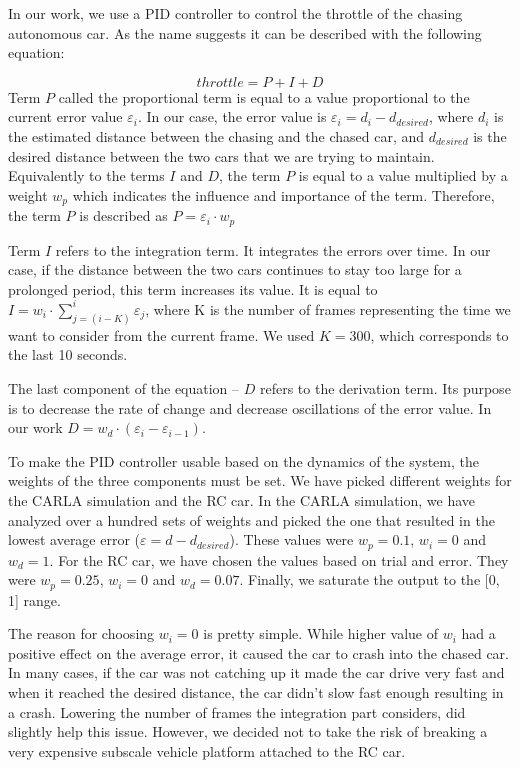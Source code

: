 \documentclass{ctuthesis/ctuthesis}
\begin{document}
In our work, we use a PID controller to control the throttle of the chasing autonomous car. As the name suggests it can be described with the following equation:

\begin{equation}
throttle = P+I+D    
\end{equation}
Term $P$ called the proportional term is equal to a value proportional to the current error value $\varepsilon_i$. In our case, the error value is $\varepsilon_i = d_i - d_{desired}$, where $d_i$ is the estimated distance between the chasing and the chased car, and $d_{desired}$ is the desired distance between the two cars that we are trying to maintain. Equivalently to the terms $I$ and $D$, the term $P$ is equal to a value multiplied by a weight $w_p$ which indicates the influence and importance of the term. Therefore, the term $P$ is described as $P = \varepsilon_i\cdot w_p$ \par


Term $I$ refers to the integration term. It integrates the errors over time. In our case, if the distance between the two cars continues to stay too large for a prolonged period, this term increases its value. It is equal to $I = w_i\cdot \sum_{j=(i-K)}^{i} \varepsilon_j$, where K is the number of frames representing the time we want to consider from the current frame. We used $K = 300$, which corresponds to the last 10 seconds.\par


The last component of the equation -- $D$ refers to the derivation term. Its purpose is to decrease the rate of change and decrease oscillations of the error value. In our work $D = w_d\cdot (\varepsilon_i-\varepsilon_{i-1})$. \par


To make the PID controller usable based on the dynamics of the system, the weights of the three components must be set. We have picked different weights for the CARLA simulation and the RC car. In the CARLA simulation, we have analyzed over a hundred sets of weights and picked the one that resulted in the lowest average error ($\varepsilon = d - d_{desired}$). These values were $w_p=0.1$, $w_i=0$ and $w_d=1$. For the RC car, we have chosen the values based on trial and error. They were $w_p=0.25$, $w_i=0$ and $w_d=0.07$. Finally, we saturate the output to the [0, 1] range. \par


The reason for choosing $w_i=0$ is pretty simple. While higher value of $w_i$ had a positive effect on the average error, it caused the car to crash into the chased car. In many cases, if the car was not catching up it made the car drive very fast and when it reached the desired distance, the car didn't slow fast enough resulting in a crash. Lowering the number of frames the integration part considers, did slightly help this issue. However, we decided not to take the risk of breaking a very expensive subscale vehicle platform attached to the RC car.
\end{document}
